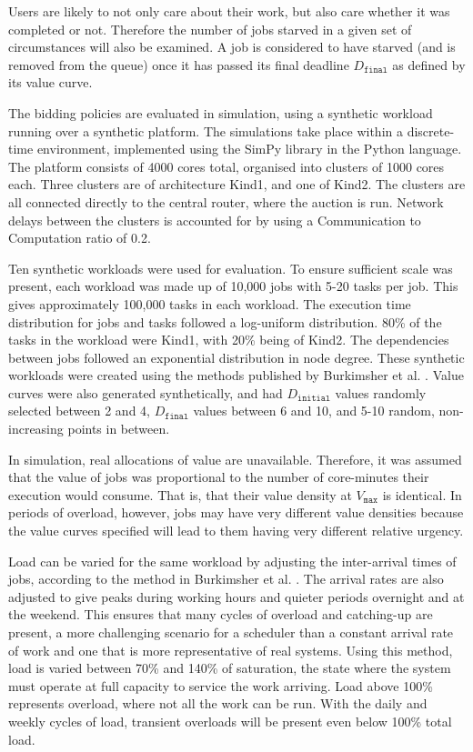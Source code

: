 \documentclass[english,british]{IEEEtran}
\begin{document}
Users are likely to not only care about their work, but also care
whether it was completed or not. Therefore the number of jobs starved
in a given set of circumstances will also be examined. A job is considered
to have starved (and is removed from the queue) once it has passed
its final deadline $D_{\mathtt{final}}$ as defined by its value curve.

The bidding policies are evaluated in simulation, using a synthetic
workload running over a synthetic platform. The simulations take place
within a discrete-time environment, implemented using the SimPy library
\cite{simpy} in the Python language. The platform consists of 4000
cores total, organised into clusters of 1000 cores each. Three clusters
are of architecture Kind1, and one of Kind2. The clusters are all
connected directly to the central router, where the auction is run.
Network delays between the clusters is accounted for by using a Communication
to Computation ratio of 0.2.

Ten synthetic workloads were used for evaluation. To ensure sufficient
scale was present, each workload was made up of 10,000 jobs with 5-20
tasks per job. This gives approximately 100,000 tasks in each workload.
The execution time distribution for jobs and tasks followed a log-uniform
distribution. 80\% of the tasks in the workload were Kind1, with 20\%
being of Kind2. The dependencies between jobs followed an exponential
distribution in node degree. These synthetic workloads were created
using the methods published by Burkimsher et al. \cite{burkimsher14}.
Value curves were also generated synthetically, and had $D_{\mathtt{initial}}$
values randomly selected between 2 and 4, $D_{\mathtt{final}}$ values
between 6 and 10, and 5-10 random, non-increasing points in between.

In simulation, real allocations of value are unavailable. Therefore,
it was assumed that the value of jobs was proportional to the number
of core-minutes their execution would consume. That is, that their
value density at $V_{\mathtt{max}}$ is identical. In periods of overload,
however, jobs may have very different value densities because the
value curves specified will lead to them having very different relative
urgency.

Load can be varied for the same workload by adjusting the inter-arrival
times of jobs, according to the method in Burkimsher et al. \cite{burkimsher14}.
The arrival rates are also adjusted to give peaks during working hours
and quieter periods overnight and at the weekend. This ensures that
many cycles of overload and catching-up are present, a more challenging
scenario for a scheduler than a constant arrival rate of work and
one that is more representative of real systems. Using this method,
load is varied between 70\% and 140\% of saturation, the state where
the system must operate at full capacity to service the work arriving.
Load above 100\% represents overload, where not all the work can be
run. With the daily and weekly cycles of load, transient overloads
will be present even below 100\% total load.
\end{document}
